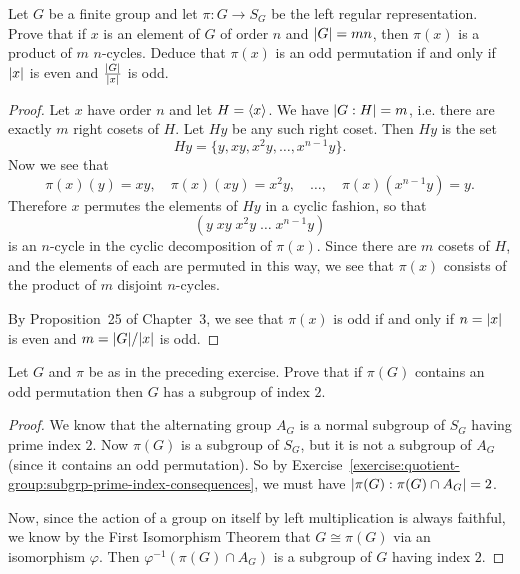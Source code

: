 \label{exercise:group-action:pi-x-prod-of-m-n-cycles}
Let $G$ be a finite group and let $\pi\colon G\to S_G$ be the left
regular representation. Prove that if $x$ is an element of $G$ of
order $n$ and $\lvert{G}\rvert = mn$, then $\pi(x)$ is a product of $m$
$n$-cycles. Deduce that $\pi(x)$ is an odd permutation if and only if
$\lvert{x}\rvert$ is even and $\frac{\lvert{G}\rvert}{\lvert{x}\rvert}$ is odd.
\begin{proof}
  Let $x$ have order $n$ and let $H = \langle{x}\rangle$. We have
  $\lvert{G : H}\rvert = m$, i.e. there are exactly $m$ right cosets of
  $H$. Let $Hy$ be any such right coset. Then $Hy$ is the set
  \begin{equation*}
    Hy = \{ y, xy, x^2y, \dots, x^{n-1}y \}.
  \end{equation*}
  Now we see that
  \begin{equation*}
    \pi(x)(y) = xy, \quad \pi(x)(xy) = x^2y, \quad \dots, \quad
    \pi(x)(x^{n-1}y) = y.
  \end{equation*}
  Therefore $x$ permutes the elements of $Hy$ in a cyclic fashion, so
  that
  \begin{equation*}
    (y\;xy\;x^2y\;\dots\;x^{n-1}y)
  \end{equation*}
  is an $n$-cycle in the cyclic decomposition of $\pi(x)$. Since there
  are $m$ cosets of $H$, and the elements of each are permuted in this
  way, we see that $\pi(x)$ consists of the product of $m$ disjoint
  $n$-cycles.

  By Proposition~25 of Chapter~3, we see that $\pi(x)$ is odd if and
  only if $n = \lvert{x}\rvert$ is even and $m = \lvert{G}\rvert/\lvert{x}\rvert$ is odd.
\end{proof}

\label{exercise:group-action:left-reg-odd-perm}
Let $G$ and $\pi$ be as in the preceding exercise. Prove that if
$\pi(G)$ contains an odd permutation then $G$ has a subgroup of index
$2$.
\begin{proof}
  We know that the alternating group $A_G$ is a normal subgroup of
  $S_G$ having prime index $2$. Now $\pi(G)$ is a subgroup of $S_G$,
  but it is not a subgroup of $A_G$ (since it contains an odd
  permutation). So by
  Exercise~\ref{exercise:quotient-group:subgrp-prime-index-consequences},
  we must have $\lvert{\pi(G) : \pi(G)\cap A_G}\rvert = 2$.

  Now, since the action of a group on itself by left multiplication is
  always faithful, we know by the First Isomorphism Theorem that
  $G\cong\pi(G)$ via an isomorphism $\varphi$. Then
  $\varphi^{-1}(\pi(G)\cap A_G)$ is a subgroup of $G$ having index
  $2$.
\end{proof}

